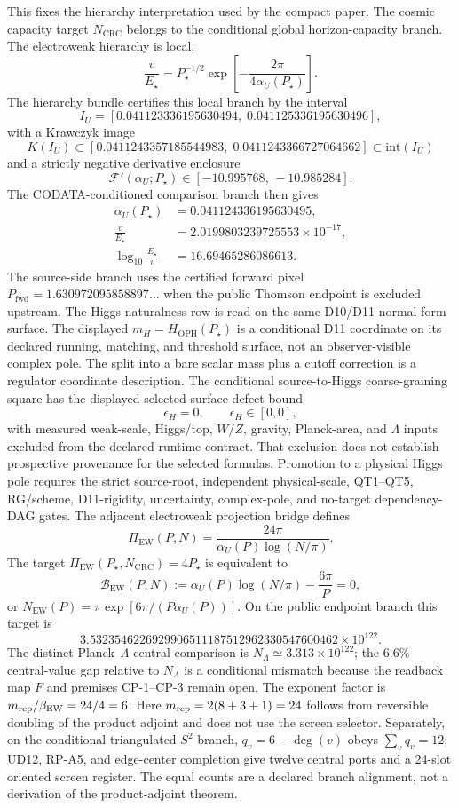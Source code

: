 \documentclass[11pt]{article}
\begin{document}
This fixes the hierarchy interpretation used by the compact paper. The cosmic capacity target
\(N_{\mathrm{CRC}}\) belongs to the conditional global horizon-capacity branch. The electroweak hierarchy is
local:
\[
\frac{v}{E_\star}
=
P_\star^{-1/2}
\exp\!\left[-\frac{2\pi}{4\alpha_U(P_\star)}\right].
\]
The hierarchy bundle certifies this local branch by the interval
\[
I_U=[0.041123336195630494,\;0.041125336195630496],
\]
with a Krawczyk image
\[
K(I_U)\subset
[0.0411243357185544983,\;0.0411243366727064662]
\subset \mathrm{int}(I_U)
\]
and a strictly negative derivative enclosure
\[
\mathcal F'(\alpha_U;P_\star)\in[-10.995768,\,-10.985284].
\]
The CODATA-conditioned comparison branch then gives
\[
\begin{aligned}
\alpha_U(P_\star)&=0.041124336195630495,\\
\frac{v}{E_\star}&=2.0199803239725553\times10^{-17},\\
\log_{10}\frac{E_\star}{v}&=16.69465286086613.
\end{aligned}
\]
The source-side branch uses the certified forward pixel
\(P_{\mathrm{fwd}}=1.630972095858897\ldots\) when the public Thomson endpoint
is excluded upstream.
The Higgs naturalness row is read on the same D10/D11 normal-form surface. The displayed
\(m_H=H_{\mathrm{OPH}}(P_\star)\) is a conditional D11 coordinate on its declared
running, matching, and threshold surface, not an observer-visible complex pole. The split
into a bare scalar mass plus a cutoff correction is a regulator coordinate description. The
conditional source-to-Higgs coarse-graining square has the displayed selected-surface defect bound
\[
\epsilon_H=0,\qquad \epsilon_H\in[0,0],
\]
with measured weak-scale, Higgs/top, \(W/Z\), gravity, Planck-area, and \(\Lambda\) inputs
excluded from the declared runtime contract.  That exclusion does not establish prospective
provenance for the selected formulas. Promotion to a physical Higgs pole requires the
strict source-root, independent physical-scale, QT1--QT5, RG/scheme, D11-rigidity,
uncertainty, complex-pole, and no-target dependency-DAG gates.
The adjacent electroweak projection bridge defines
\[
\Pi_{\mathrm{EW}}(P,N)
=
\frac{24\pi}{\alpha_U(P)\log(N/\pi)}.
\]
The target \(\Pi_{\mathrm{EW}}(P_\star,N_{\mathrm{CRC}})=4P_\star\) is equivalent to
\[
\mathcal B_{\mathrm{EW}}(P,N)
:=
\alpha_U(P)\log(N/\pi)-\frac{6\pi}{P}=0,
\]
or \(N_{\mathrm{EW}}(P)=\pi\exp[6\pi/(P\alpha_U(P))]\). On the public endpoint branch this
target is
\[
3.5323546226929906511187512962330547600462\times10^{122}.
\]
The distinct
Planck--\(\Lambda\) central comparison is \(N_{\Lambda}\simeq3.313\times10^{122}\); the
\(6.6\%\) central-value gap relative to \(N_{\Lambda}\) is a conditional mismatch because the
readback map \(F\) and premises CP-1--CP-3 remain open.
The exponent factor is \(m_{\rm rep}/\beta_{\rm EW}=24/4=6\).
Here \(m_{\rm rep}=2(8+3+1)=24\) follows from reversible doubling of the
product adjoint and does not use the screen selector. Separately, on the
conditional triangulated \(S^2\) branch, \(q_v=6-\deg(v)\) obeys
\(\sum_v q_v=12\); UD12, RP-A5, and edge-center completion give twelve
central ports and a 24-slot oriented screen register. The equal counts are a
declared branch alignment, not a derivation of the product-adjoint theorem.
\end{document}
